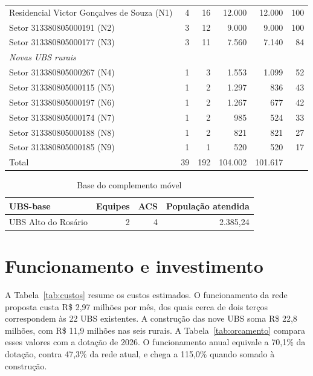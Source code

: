 \begin{longtable}{p{.42\linewidth}rrrrr}
Residencial Victor Gonçalves de Souza (N1) & 4 & 16 & 12.000 & 12.000 & 100\\
Setor 313380805000191 (N2) & 3 & 12 & 9.000 & 9.000 & 100\\
Setor 313380805000177 (N3) & 3 & 11 & 7.560 & 7.140 & 84\\
\midrule
\multicolumn{6}{l}{\textit{Novas UBS rurais}}\\
Setor 313380805000267 (N4) & 1 & 3 & 1.553 & 1.099 & 52\\
Setor 313380805000115 (N5) & 1 & 2 & 1.297 & 836 & 43\\
Setor 313380805000197 (N6) & 1 & 2 & 1.267 & 677 & 42\\
Setor 313380805000174 (N7) & 1 & 2 & 985 & 524 & 33\\
Setor 313380805000188 (N8) & 1 & 2 & 821 & 821 & 27\\
Setor 313380805000185 (N9) & 1 & 1 & 520 & 520 & 17\\
\midrule
Total & 39 & 192 & 104.002 & 101.617 & \\
\bottomrule\end{longtable}\endgroup
{}

\begin{table}[htbp]\centering
\caption{Base do complemento móvel}\label{tab:movel}
\begin{tabular}{lrrr}\toprule UBS-base & Equipes & ACS & População atendida\\\midrule
UBS Alto do Rosário & 2 & 4 & 2.385,24\\
\bottomrule\end{tabular}
\end{table}

\section{Funcionamento e investimento}

A Tabela~\ref{tab:custos} resume os custos estimados. O funcionamento da rede proposta custa
R\$ 2,97 milhões por mês, dos quais cerca de dois terços correspondem às 22 UBS existentes. A construção
das nove UBS soma R\$ 22,8 milhões, com R\$ 11,9 milhões nas seis rurais. A Tabela~\ref{tab:orcamento}
compara esses valores com a dotação de 2026. O funcionamento anual equivale a 70,1\% da dotação, contra
47,3\% da rede atual, e chega a 115,0\% quando somado à construção.

